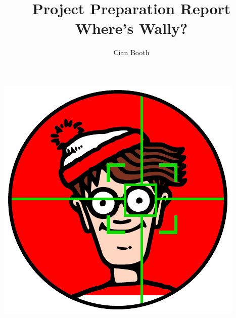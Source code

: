 \documentclass[a4paper,12pt]{article}
\author{Cian Booth}
\title{Project Preparation Report\\ Where's Wally?}
\begin{document}
	\maketitle
  \begin{center}
    \includegraphics{wally}
  \end{center}
  \pagebreak
  \tableofcontents
  \pagebreak
  
  
  
  
\end{document}
